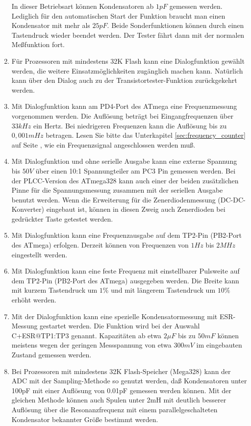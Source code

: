 \begin{enumerate}
In dieser Betriebsart können Kondensatoren ab \(1pF\) gemessen werden. Lediglich für den automatischen Start der Funktion
braucht man einen Kondensator mit mehr als \(25pF\).
Beide Sonderfunktionen können durch einen Tastendruck wieder beendet werden. Der Tester fährt dann mit der normalen
Meßfunktion fort.
\item Für Prozessoren mit mindestens 32K Flash kann eine Dialogfunktion gewählt werden, 
die weitere Einsatzmöglichkeiten zugänglich machen kann.
Natürlich kann über den Dialog auch zu der Transistortester-Funktion zurückgekehrt werden.
\item Mit Dialogfunktion kann am PD4-Port des ATmega eine Frequenzmessung vorgenommen werden.
Die Auflösung beträgt bei Eingangfrequenzen über \(33kHz\) ein Hertz.
Bei niedrigeren Frequenzen kann die Auflösung bis zu \(0,001mHz\) betragen.
Lesen Sie bitte das Unterkapitel \ref{sec:frequency_counter} auf Seite \pageref{sec:frequency_counter},
wie ein Frequenzsignal angeschlossen werden muß.
\item Mit Dialogfunktion und ohne serielle Ausgabe kann eine externe Spannung bis \(50V\) über einen
10:1 Spannungteiler am PC3 Pin gemessen werden. Bei der PLCC-Version des ATmega328 kann auch einer der beiden
zusätzlichen Pinne für die Spannungsmessung zusammen mit der seriellen Ausgabe benutzt werden.
Wenn die Erweiterung für die Zenerdiodenmessung (DC-DC-Konverter)
eingebaut ist, können in diesen Zweig auch Zenerdioden bei gedrückter Taste getestet werden.
\item Mit Dialogfunktion kann eine Frequenzausgabe auf dem TP2-Pin (PB2-Port des ATmega) erfolgen.
Derzeit können von Frequenzen von \(1Hz\) bis \(2MHz\) eingestellt werden.
\item Mit Dialogfunktion kann eine feste Frequenz mit einstellbarer Pulsweite auf dem TP2-Pin (PB2-Port des ATmega)
ausgegeben werden.
Die Breite kann mit kurzem Tastendruck um \(1\%\) und mit längerem Tastendruck um \(10\%\) erhöht werden.
\item Mit der Dialogfunktion kann eine spezielle Kondensatormessung mit ESR-Messung gestartet werden.
Die Funktion wird bei der Auswahl \mbox{C+ESR@TP1:TP3} genannt.
 Kapazitäten ab etwa \(2\mu F\) bis zu \(50mF\) können meistens wegen der geringen Messspannung von etwa \(300mV\)
 im eingebauten Zustand gemessen werden.
\item Bei Prozessoren mit mindestens 32K Flash-Speicher (Mega328) kann der ADC mit der Sampling-Methode so genutzt werden,
daß Kondensatoren unter 100pF mit einer Auflösung von 0.01pF gemessen werden können. Mit der gleichen Methode können
auch Spulen unter 2mH mit deutlich besserer Auflösung über die Resonanzfrequenz mit einem parallelgeschalteten Kondensator 
bekannter Größe bestimmt werden.

\end{enumerate}

